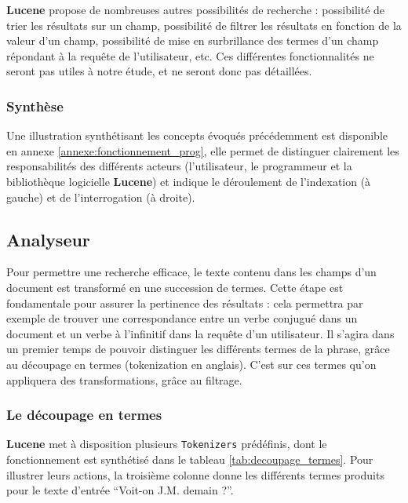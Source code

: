 \textbf{Lucene} propose de nombreuses autres possibilités de recherche : possibilité de trier les résultats sur un champ, possibilité de filtrer les résultats en fonction de la valeur d’un champ, possibilité de mise en surbrillance des termes d’un champ répondant à la requête de l’utilisateur, etc. Ces différentes fonctionnalités ne seront pas utiles à notre étude, et ne seront donc pas détaillées.

\subsubsection{Synthèse}

Une illustration synthétisant les concepts évoqués précédemment est disponible en annexe \ref{annexe:fonctionnement_prog}, elle permet de distinguer clairement les responsabilités des différents acteurs (l’utilisateur, le programmeur et la bibliothèque logicielle \textbf{Lucene}) et indique le déroulement de l’indexation (à gauche) et de l'interrogation (à droite).


\subsection{Analyseur}

Pour permettre une recherche efficace, le texte contenu dans les champs d’un document est transformé en une succession de termes. Cette étape est fondamentale pour assurer la pertinence des résultats : cela permettra par exemple de trouver une correspondance entre un verbe conjugué dans un document et un verbe à l’infinitif dans la requête d’un utilisateur. Il s’agira dans un premier temps de pouvoir distinguer les différents termes de la phrase, grâce au découpage en termes (tokenization en anglais). C’est sur ces termes qu’on appliquera des transformations, grâce au filtrage.

\subsubsection{Le découpage en termes}
\label{section:tokenizer}

\textbf{Lucene} met à disposition plusieurs \texttt{Tokenizers} prédéfinis, dont le fonctionnement est synthétisé dans le tableau \ref{tab:decoupage_termes}. Pour illustrer leurs actions, la troisième colonne donne les différents termes produits pour le texte d’entrée “Voit-on J.M. demain ?”.
 

